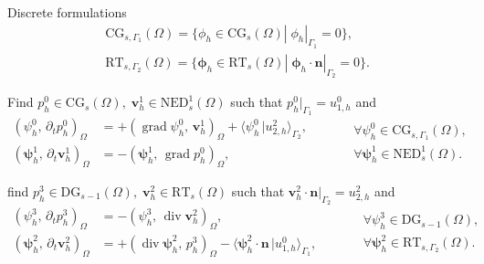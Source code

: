 \documentclass[aspectratio=169]{beamer}
\DeclareMathOperator*{\grad}{grad}
\renewcommand{\div}{\operatorname{div}}
\newcommand{\inpr}[3][]{\ensuremath{( #2, \, #3 )_{#1}}}
\newcommand{\dualpr}[3][]{\ensuremath{\langle #2 \, \vert #3 \rangle_{#1}}}
\begin{document}
\begin{frame}{Discrete formulations}
	\begin{equation*}
		\begin{aligned}
		\mathrm{CG}_{s, \Gamma_1}(\Omega) = \{\phi_h \in \mathrm{CG}_{s}(\Omega) |\; \phi_h|_{\Gamma_1} = 0\}, \\
		\mathrm{RT}_{s, \Gamma_2}(\Omega) = \{\bm{\phi}_h \in \mathrm{RT}_{s}(\Omega) |\; \bm{\phi}_h \cdot \bm{n}|_{\Gamma_2} = 0\}.
		\end{aligned}
	\end{equation*}
	
		
		
		\begin{tcolorbox}[nobeforeafter, colframe=theme,title=Primal weak formulation]%
		Find $p^0_h \in \mathrm{CG}_{s}(\Omega), \; \bm{v}^1_h \in \mathrm{NED}^1_s(\Omega)$ such that $p^0_h|_{\Gamma_1} = u^0_{1, h}$ and
		\begin{equation*}
			\begin{aligned}
				\inpr[\Omega]{\psi^0_h}{\partial_t p^0_h} &= +\inpr[\Omega]{\grad \psi^0_h}{\bm{v}^1_h} + \dualpr[\Gamma_2]{\psi^0_h}{u^2_{2, h}}, \\
				\inpr[\Omega]{\bm{\psi}^1_h}{\partial_t \bm{v}^1_h} &= -\inpr[\Omega]{\bm{\psi}^1_h}{\grad {p}^0_h},
			\end{aligned} \qquad
			\begin{aligned}
				&\forall \psi^0_h \in \mathrm{CG}_{s, \Gamma_1}(\Omega), \\
				&\forall \bm{\psi}^1_h \in \mathrm{NED}^1_{s}(\Omega).
			\end{aligned}
		\end{equation*}	
			
		\end{tcolorbox} 
	
		
	\begin{tcolorbox}[nobeforeafter, colframe=theme,title=Dual weak formulation]%
		find $p^3_h \in \mathrm{DG}_{s-1}(\Omega), \; \bm{v}^2_h \in \mathrm{RT}_{s}(\Omega)$ such that $\bm{v}^2_h \cdot \bm{n}|_{\Gamma_2} = u^2_{2, h}$ and
		\begin{equation*}
			\begin{aligned}
				\inpr[\Omega]{\psi^3_h}{\partial_t p^3_h} &= -\inpr[\Omega]{\psi^3_h}{\div\bm{v}^2_h}, \\
				\inpr[\Omega]{\bm{\psi}^2_h}{\partial_t \bm{v}^2_h} &= +\inpr[\Omega]{\div \bm{\psi}^2_h}{{p}^3_h} - \dualpr[\Gamma_1]{\bm{\psi}^2_h \cdot \bm{n}}{u^0_{1, h}},
			\end{aligned} \qquad
			\begin{aligned}
				&\forall \psi^3_h \in \mathrm{DG}_{s-1}(\Omega), \\
				&\forall \bm{\psi}^2_h \in \mathrm{RT}_{s, \Gamma_2}(\Omega).
			\end{aligned}
		\end{equation*}
	\end{tcolorbox} 

	\end{frame}
\end{document}
